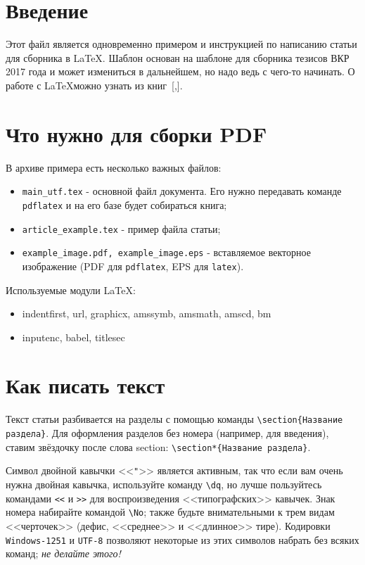 
\section*{Введение}

Этот файл является одновременно примером и инструкцией по написанию статьи для сборника в \LaTeX. 
Шаблон основан на шаблоне для сборника тезисов ВКР 2017 года и может измениться в дальнейшем, но надо ведь с чего-то начинать.
О работе с \LaTeX можно узнать из книг~[,].

\section{Что нужно для сборки PDF}

В архиве примера есть несколько важных файлов:

\begin{itemize}
 \item 
 \texttt{main\_utf.tex} - основной файл документа. Его нужно передавать команде \texttt{pdflatex} и на его базе будет собираться книга;
 \item 
 \texttt{article\_example.tex} - пример файла статьи;
 \item
 \texttt{example\_image.pdf, example\_image.eps} - вставляемое векторное изображение (PDF для \texttt{pdflatex}, EPS для \texttt{latex}).
\end{itemize}

Используемые модули \LaTeX:

\begin{itemize}
 \item indentfirst, url, graphicx, amssymb, amsmath, amscd, bm
 \item inputenc, babel, titlesec
\end{itemize}

\section{Как писать текст}

Текст статьи разбивается на разделы с помощью команды \texttt{\textbackslash section\{Название раздела\}}. Для оформления разделов без номера (например, для введения), ставим звёздочку после слова section: \texttt{\textbackslash section*\{Название раздела\}}.

Символ двойной кавычки <<\verb.".>> является активным, так что если вам очень нужна двойная кавычка, используйте команду \verb.\dq., но лучше пользуйтесь командами \verb.<<. и \verb.>>. для воспроизведения <<типографских>> кавычек.
Знак номера набирайте командой \verb.\No.; также будьте внимательными к трем видам <<черточек>> (дефис, <<среднее>> и <<длинное>> тире).
Кодировки \texttt{Windows-1251} и \texttt{UTF-8} позволяют некоторые из этих
символов набрать без всяких команд; \emph{не делайте этого!}

